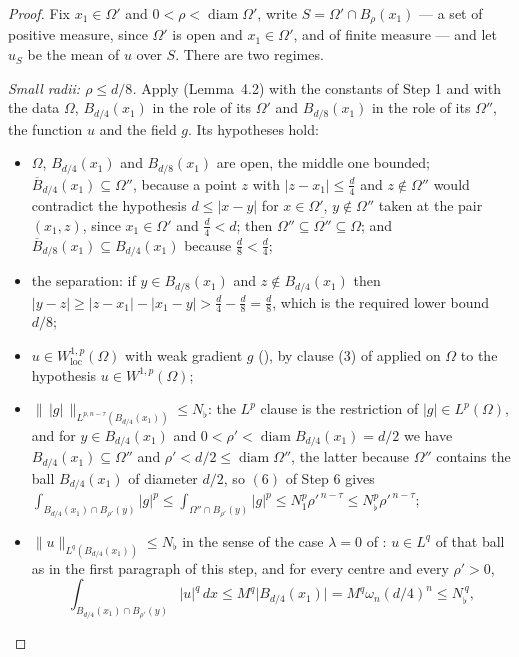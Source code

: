\begin{proof}
Fix $x_1\in\Omega'$ and $0<\rho<\operatorname{diam}\Omega'$, write
$S=\Omega'\cap B_\rho(x_1)$ --- a set of positive measure, since $\Omega'$ is
open and $x_1\in\Omega'$, and of finite measure --- and let $u_S$ be the mean of
$u$ over $S$.  There are two regimes.

\emph{Small radii: $\rho\le d/8$.}  Apply 
(Lemma~4.2) with the constants of Step 1 and with the data
$\Omega$, $B_{d/4}(x_1)$ in the role of its $\Omega'$ and $B_{d/8}(x_1)$ in the
role of its $\Omega''$, the function $u$ and the field $g$.  Its hypotheses
hold:
\begin{itemize}
\item $\Omega$, $B_{d/4}(x_1)$ and $B_{d/8}(x_1)$ are open, the middle one
  bounded; $\overline B_{d/4}(x_1)\subseteq\Omega''$, because a point $z$ with
  $|z-x_1|\le\frac d4$ and $z\notin\Omega''$ would contradict the hypothesis
  $d\le|x-y|$ for $x\in\Omega'$, $y\notin\Omega''$ taken at the pair
  $(x_1,z)$, since $x_1\in\Omega'$ and $\frac d4<d$; then
  $\Omega''\subseteq\overline{\Omega''}\subseteq\Omega$; and
  $\overline B_{d/8}(x_1)\subseteq B_{d/4}(x_1)$ because $\frac d8<\frac d4$;
\item the separation: if $y\in B_{d/8}(x_1)$ and $z\notin B_{d/4}(x_1)$ then
  $|y-z|\ge|z-x_1|-|x_1-y|>\frac d4-\frac d8=\frac d8$, which is the required
  lower bound $d/8$;
\item $u\in W^{1,p}_{\mathrm{loc}}(\Omega)$ with weak gradient $g$
  (), by clause (3) of 
  applied on $\Omega$ to the hypothesis $u\in W^{1,p}(\Omega)$;
\item $\|\,|g|\,\|_{L^{p,n-\tau}(B_{d/4}(x_1))}\le N_\flat$: the $L^p$ clause is
  the restriction of $|g|\in L^p(\Omega)$, and for $y\in B_{d/4}(x_1)$ and
  $0<\rho'<\operatorname{diam}B_{d/4}(x_1)=d/2$ we have
  $B_{d/4}(x_1)\subseteq\Omega''$ and
  $\rho'<d/2\le\operatorname{diam}\Omega''$, the latter because $\Omega''$
  contains the ball $B_{d/4}(x_1)$ of diameter $d/2$, so $(6)$ of Step 6
  gives $\int_{B_{d/4}(x_1)\cap B_{\rho'}(y)}|g|^p
  \le\int_{\Omega''\cap B_{\rho'}(y)}|g|^p\le N_1^p\rho'^{\,n-\tau}
  \le N_\flat^p\rho'^{\,n-\tau}$;
\item $\|u\|_{L^q(B_{d/4}(x_1))}\le N_\flat$ in the sense of the case
  $\lambda=0$ of : $u\in L^q$ of that ball as in the
  first paragraph of this step, and for every centre and every $\rho'>0$,
  \[
  \int_{B_{d/4}(x_1)\cap B_{\rho'}(y)}|u|^q\,dx
  \le M^q\bigl|B_{d/4}(x_1)\bigr|=M^q\omega_n(d/4)^n\le N_\flat^{\,q},
\]
\end{itemize}
\end{proof}
